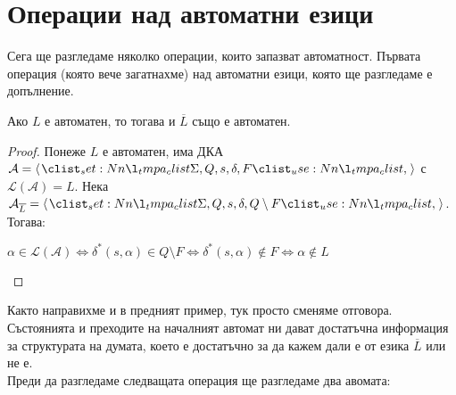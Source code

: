 \section{Операции над автоматни езици}

Сега ще разгледаме няколко операции, които запазват автоматност.
Първата операция (която вече загатнахме) над автоматни езици, която ще разгледаме е допълнение.

\begin{claim}
    Ако $L$ е автоматен, то тогава и $\overline{L}$ също е автоматен.
\end{claim}

\begin{proof}
    Понеже $L$ е автоматен, има ДКА $\mathcal{A} = \opair{\Sigma, Q, s, \delta, F}$ с $\mathcal{L(A)} = L$.
    Нека $\mathcal{A}_{\overline{L}} = \opair{\Sigma, Q, s, \delta, Q \setminus F}$. Тогава:
    \begin{center}
        $\alpha \in \mathcal{L(A)} \iff \delta^*(s, \alpha) \in Q \setminus F \iff \delta^*(s, \alpha) \notin F \iff \alpha \notin L$
    \end{center}
\end{proof}

Както направихме и в предният пример, тук просто сменяме отговора.
Състоянията и преходите на началният автомат ни дават достатъчна информация за структурата на думата,
което е достатъчно за да кажем дали е от езика $\overline{L}$ или не е. \\

Преди да разгледаме следващата операция ще разгледаме два авомата:

\begin{center}
\end{center}

\begin{center}
\end{center}

